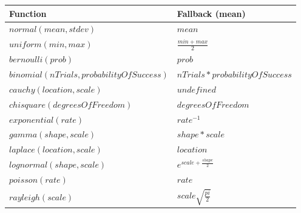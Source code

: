 \documentclass[draftspec]{sbmlpkgspec}
\newcommand{\threeone}{SBML Level~3 Version~1\xspace}
\newcommand{\threetwo}{SBML Level~3 Version~2\xspace}
\newcommand{\distribshort}{\emph{distrib}\xspace}
\newcommand{\mathml}{MathML\xspace}
\begin{document}
\begin{longtabu} to 0.7\textwidth {
    X[5,r]
    X[5,l]}
\textbf{Function} & \textbf{Fallback (mean)} \\ \midrule
\footnotesize{$normal(mean, stdev)$} &\footnotesize{$mean$}
\\ \midrule
\footnotesize{$uniform(min, max)$} &\footnotesize{$\frac{min+max}{2}$}
\\ \midrule
\footnotesize{$bernoulli(prob)$} &\footnotesize{$prob$}
\\ \midrule
\footnotesize{$binomial(nTrials, probabilityOfSuccess)$} &\footnotesize{$nTrials * probabilityOfSuccess$}
\\ \midrule
\footnotesize{$cauchy(location, scale)$} &\footnotesize{$undefined$}
\\ \midrule
\footnotesize{$chisquare(degreesOfFreedom)$} &\footnotesize{$degreesOfFreedom$}
\\ \midrule
\footnotesize{$exponential(rate)$} &\footnotesize{$rate^{-1}$}
\\ \midrule
\footnotesize{$gamma(shape, scale)$} &\footnotesize{$shape*scale$}
\\ \midrule
\footnotesize{$laplace(location, scale)$} &\footnotesize{$location$}
\\ \midrule
\footnotesize{$lognormal(shape, scale)$} &\footnotesize{$e^{scale+\frac{shape}{2}}$}
\\ \midrule
\footnotesize{$poisson(rate)$} &\footnotesize{$rate$}
\\ \midrule
\footnotesize{$rayleigh(scale)$} &\footnotesize{$scale \sqrt{\frac{pi}{2}}$}
\\
\bottomrule
\end{longtabu}




\end{document}
